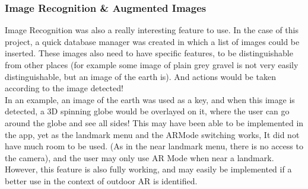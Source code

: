  \subsubsection{Image Recognition \& Augmented Images}
 Image Recognition was also a really interesting feature to use. 
 In the case of this project, a quick database manager was created in which a list of images could
  be inserted. These images also need to have specific features, to be distinguishable from other places (for example some image of plain grey gravel is not very easily distinguishable, but an image of the earth is). And actions would be taken according to the image detected!\\

In an example, an image of the earth was used as a key, and when this image is detected, a 3D spinning 
globe would be overlayed on it, where the user can go around the globe and see all sides!
This may have been able to be implemented in the app, yet as the landmark menu and the ARMode switching 
works, It did not have much room to be used. (As in the near landmark menu, there is 
no access to the camera), and the user may only use AR Mode when near a landmark. However, this 
feature is also fully working, and may easily be implemented if a better use in the context of outdoor AR is identified. 

